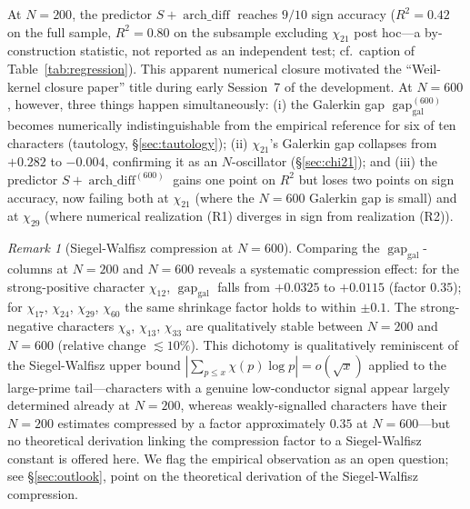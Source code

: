 \documentclass[a4paper,10pt,twocolumn]{article}
\theoremstyle{definition}
\theoremstyle{remark}
\newtheorem{remark}[theorem]{Remark}
\newcommand{\gap}{\operatorname{gap}}
\newcommand{\chifn}{\chi}
\newcommand{\archdiff}{\operatorname{arch\_diff}}
\begin{document}
At $N=200$, the predictor $S+\archdiff$ reaches $9/10$ sign accuracy
($R^2=0.42$ on the full sample, $R^2=0.80$ on the subsample
excluding $\chifn_{21}$ post hoc---a by-construction statistic, not
reported as an independent test; cf.\ caption of
Table~\ref{tab:regression}). This apparent numerical closure
motivated the ``Weil-kernel closure paper'' title during early
Session~7 of the development. At $N=600$, however, three things
happen simultaneously:
(i) the Galerkin gap $\gap_{\mathrm{gal}}^{(600)}$ becomes
numerically indistinguishable from the empirical reference for six
of ten characters (tautology, \S\ref{sec:tautology});
(ii) $\chifn_{21}$'s Galerkin gap collapses from $+0.282$ to
$-0.004$, confirming it as an $N$-oscillator
(\S\ref{sec:chi21}); and
(iii) the predictor $S+\archdiff^{(600)}$ gains one point on
$R^2$ but loses two points on sign accuracy, now failing both at
$\chifn_{21}$ (where the $N=600$ Galerkin gap is small) and at
$\chifn_{29}$ (where numerical realization (R1) diverges in sign
from realization (R2)).

\begin{remark}[Siegel-Walfisz compression at $N=600$]
\label{rem:sw-compression}
Comparing the $\gap_{\mathrm{gal}}$-columns at $N=200$ and $N=600$
reveals a systematic compression effect: for the strong-positive
character $\chifn_{12}$, $\gap_{\mathrm{gal}}$ falls from
$+0.0325$ to $+0.0115$ (factor $0.35$); for $\chifn_{17}$,
$\chifn_{24}$, $\chifn_{29}$, $\chifn_{60}$ the same
shrinkage factor holds to within $\pm 0.1$. The strong-negative
characters $\chifn_8$, $\chifn_{13}$, $\chifn_{33}$ are
qualitatively stable between $N=200$ and $N=600$ (relative change
$\lesssim 10\%$). This dichotomy is qualitatively reminiscent of the
Siegel-Walfisz upper bound $|\sum_{p\leq x}\chifn(p)\log p|
=o(\sqrt{x})$ applied to the large-prime tail---characters with a
genuine low-conductor signal appear largely determined already at
$N=200$, whereas weakly-signalled characters have their $N=200$
estimates compressed by a factor approximately $0.35$ at $N=600$---but
no theoretical derivation linking the compression factor to a
Siegel-Walfisz constant is offered here. We flag the empirical
observation as an open question; see \S\ref{sec:outlook}, point on
the theoretical derivation of the Siegel-Walfisz compression.
\end{remark}
\end{document}
